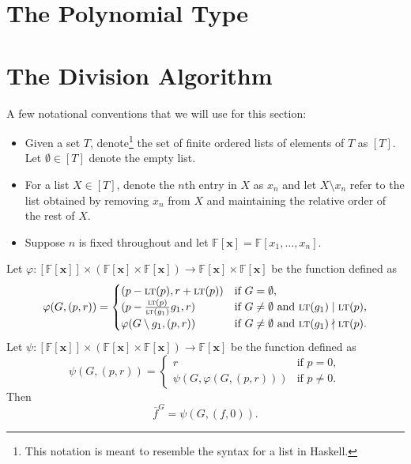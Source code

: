 \documentclass[MS, xcolor=dvipsnames]{wfuthesis}
\def\bF{\mathbb{F}}
\newcommand{\LT}{\ensuremath{\text{\sc lt}}}
\def\and{\text{ and }}
\theoremstyle{definition}
\def\p{\varphi}
\begin{document}
\section{The Polynomial Type}

\section{The Division Algorithm}
A few notational conventions that we will use for this section:
\begin{itemize}
  \item Given a set $T$, denote\footnote{This notation is meant to resemble the syntax for a list in Haskell.} the set of finite ordered lists of elements of $T$ as $[T]$. Let $\emptyset \in [T]$ denote the empty list. 
  \item For a list $X \in [T]$, denote the $n$th entry in $X$ as $x_n$ and let $X \setminus x_n$ refer to the list obtained by removing $x_n$ from $X$ and maintaining the relative order of the rest of $X$. 
  \item Suppose $n$ is fixed throughout and let $\bF[\mathbf x] = \bF[x_1,\dots,x_n]$. 
\end{itemize}
Let $\p: [\bF[\mathbf x]] \times \left( \bF[\mathbf x] \times \bF[\mathbf x] \right) \to \bF[\mathbf x] \times \bF[\mathbf x]$ be the function defined as 
\[ \p(G,(p,r)) = \begin{cases} (p-\LT(p),r+\LT(p)) &\text{if } G = \emptyset, \\ (p-\frac{\LT(p)}{\LT(g_1)}g_1,r) &\text{if } G \ne \emptyset \and \LT(g_1) \mid \LT(p), \\ \p(G\setminus g_1,(p,r)) &\text{if } G \ne \emptyset \and \LT(g_1) \nmid \LT(p). \end{cases} \]
Let $\psi: [\bF[\mathbf x]] \times \left( \bF[\mathbf x] \times \bF[\mathbf x] \right) \to \bF[\mathbf x]$ be the function defined as
\[ \psi(G,(p,r)) = \begin{cases} r &\text{if } p = 0, \\ \psi(G,\p(G,(p,r))) &\text{if } p \ne 0. \end{cases} \]
Then
\[ \overline f^{G} = \psi(G,(f,0)). \]
\end{document}
